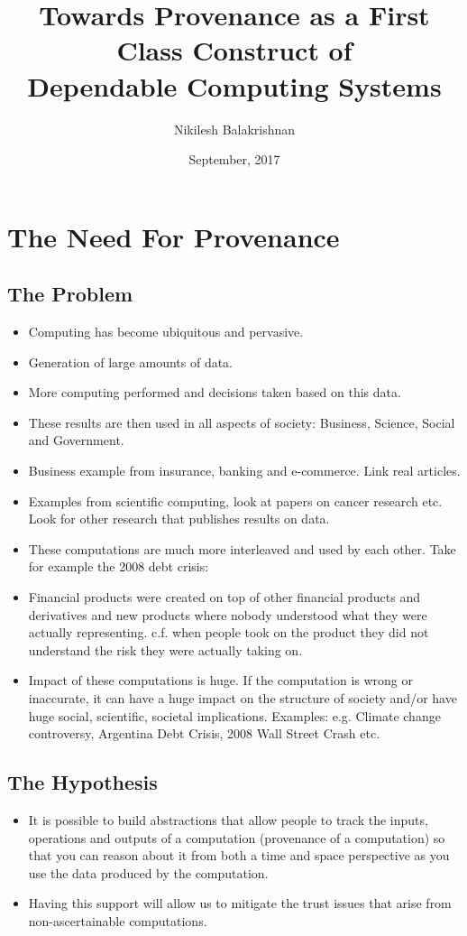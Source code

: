 \documentclass[withindex,glossary]{cam-thesis}
\title{Towards Provenance as a First Class Construct of \\
Dependable Computing Systems}
\author{Nikilesh Balakrishnan}
\date{September, 2017}
\begin{document}
\frontmatter{}



\chapter{The Need For Provenance}

\section{The Problem}
\begin{itemize}
\item Computing has become ubiquitous and pervasive.
\item Generation of large amounts of data.
\item More computing performed and decisions taken based on this data.
\item These results are then used in all aspects of society: Business, Science, Social and Government.
\item Business example from insurance, banking and e-commerce. Link real articles.
\item Examples from scientific computing, look at papers on cancer research etc. Look for other research that publishes results on data.
\item These computations are much more interleaved and used by each other. Take for example the 2008 debt crisis:
\item Financial products were created on top of other financial products and derivatives and new products where nobody understood
what they were actually representing. c.f. when people took on the product they did not understand the risk they were actually taking on.
\item Impact of these computations is huge. If the computation is wrong or inaccurate, it can have a huge impact on the structure of
society and/or have huge social, scientific, societal implications. Examples: e.g. Climate change controversy, Argentina Debt Crisis,
2008 Wall Street Crash etc.
\end{itemize}

\section{The Hypothesis}
\begin{itemize}
\item It is possible to build abstractions that allow people to track the inputs, operations and outputs of a computation
(provenance of a computation) so that you can reason about it from both a time and space perspective as you use the data
produced by the computation.
\item Having this support will allow us to mitigate the trust issues that arise from non-ascertainable computations.
\end{itemize}
\end{document}
